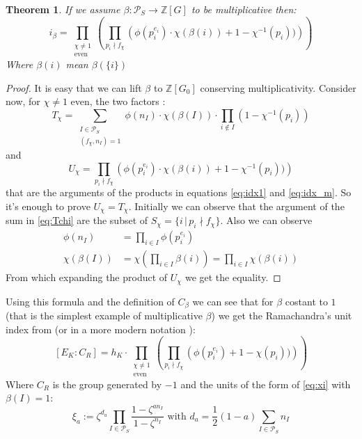 \documentclass[]{article}
\theoremstyle{plain}
\newtheorem{teo}{Theorem}[section]
\theoremstyle{remark}
\theoremstyle{definition}
\newcommand{\PS}{\mathcal{P}_S}
\newcommand{\Z}{\mathbb{Z}}
\begin{document}
	\begin{teo}
		\label{teo:idx_m}
		If we assume $ \beta : \PS \to \Z[G] $ to be multiplicative then:
		\begin{equation}\label{eq:idx_m}
			i_\beta =  \prod_{ \substack{\chi \neq 1 \\ \text{even}}} \left( \prod_{p_i \nmid f_\chi} \left( \phi (p_i^{e_i}) \cdot \chi (\beta (i))  + 1- \chi^{-1} (p_i))\right)  \right) 
		\end{equation}
		Where $ \beta(i) $ mean $ \beta (\{i\})$
	\end{teo}

	\begin{proof}
		It is easy that we can lift $ \beta $ to $ \Z [G_0] $ conserving multiplicativity. Consider now, for $ \chi \neq 1 $ even, the two factors :
		\begin{equation}\label{eq:Tchi}
			T_\chi = \sum_{\substack{ I \in \PS \\ (f_\chi , n_I) = 1}} \phi (n_I) \cdot \chi (\beta (I)) \cdot \prod_{i \not \in  I} (1- \chi^{-1} (p_i)) 
		\end{equation}
		and 
		\begin{equation}\label{eq:Uchi}
			U_\chi = \prod_{p_i \nmid f_\chi} \left( \phi (p_i^{e_i}) \cdot \chi (\beta (i))  + 1- \chi^{-1} (p_i))\right)
		\end{equation}
		that are the arguments of the products in equations \ref{eq:idx1} and \ref{eq:idx_m}. So it's enough to prove $ U_\chi = T_\chi $. 
		Initially we can observe that the argument of the sum in \ref{eq:Tchi} are the subset of $ S_\chi = \{ i \,|\, p_i \nmid f_\chi \} $. Also we can observe 
		 \begin{align*}
		 	\phi (n_I ) & = \prod_{ i \in I} \phi(p_i^{e_i})\\
		 	\chi( \beta (I)) & = \chi \left(  \prod_{ i \in I} \beta(i) \right)  = \prod_{ i \in I} \chi(\beta (i))
		 \end{align*}
		 From which expanding the product of $ U_\chi $ we get the equality.
	\end{proof}

	Using this formula and the definition of $ C_\beta $ we can see that for $\beta$ costant to $ 1 $ (that is the simplest example of multiplicative $\beta$) we get the Ramachandra's unit index from \cite{RAM} (or in a more modern notation \cite[Theorem~8.3]{CF} ):
	\begin{equation}\label{eq:idx_ram}
		[E_K : C_R ] = h_K \cdot  \prod_{ \substack{\chi \neq 1 \\ \text{even}}} \left( \prod_{p_i \nmid f_\chi} \left( \phi (p_i^{e_i})  + 1- \chi (p_i))\right)  \right) 
	\end{equation}
	Where $ C_R $ is the group generated by $ -1 $ and the units of the form of \ref{eq:xi} with $ \beta(I) = 1  $:
	\[ \xi_a := \zeta ^{d_a } \prod _{I \in \PS} \frac{ 1 - \zeta^{an_I}}{ 1 - \zeta^{n_I}}  \text{ with } d_a =\frac{1}{2}(1-a) \sum_{I \in \PS} n_I\]
	
\end{document}
